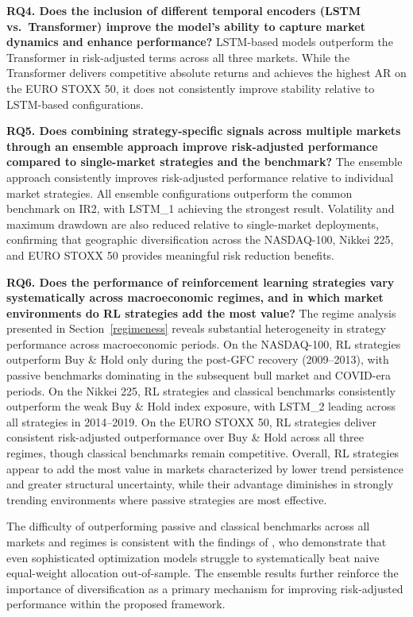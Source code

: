\documentclass[]{elsarticle}
\begin{document}
\noindent\textbf{RQ4. Does the inclusion of different temporal encoders (LSTM vs.\ Transformer) improve the model's ability to capture market dynamics and enhance performance?}
\newline LSTM-based models outperform the Transformer in risk-adjusted terms across all three markets. While the Transformer delivers competitive absolute returns and achieves the highest AR on the EURO STOXX 50, it does not consistently improve stability relative to LSTM-based configurations.

\noindent\textbf{RQ5. Does combining strategy-specific signals across multiple markets through an ensemble approach improve risk-adjusted performance compared to single-market strategies and the benchmark?}
\newline The ensemble approach consistently improves risk-adjusted performance relative to individual market strategies. All ensemble configurations outperform the common benchmark on IR2, with LSTM\_1 achieving the strongest result. Volatility and maximum drawdown are also reduced relative to single-market deployments, confirming that geographic diversification across the NASDAQ-100, Nikkei 225, and EURO STOXX 50 provides meaningful risk reduction benefits.

\noindent\textbf{RQ6. Does the performance of reinforcement learning strategies 
vary systematically across macroeconomic regimes, and in which market environments do RL strategies add the most value?}
\newline The regime analysis presented in Section~\ref{regimeness} reveals substantial heterogeneity in strategy performance across macroeconomic periods. On the NASDAQ-100, RL strategies outperform Buy \& Hold only during the post-GFC recovery (2009--2013), with passive benchmarks dominating in the subsequent bull market and COVID-era periods. On the Nikkei 225, RL strategies and classical benchmarks consistently outperform the weak Buy \& Hold index exposure, with LSTM\_2 leading across all strategies in 2014--2019. On the EURO STOXX 50, RL strategies deliver consistent risk-adjusted outperformance over Buy \& Hold across all three regimes, though classical benchmarks remain competitive. Overall, RL strategies appear to add the most value in markets characterized by lower trend persistence and greater structural uncertainty, while their advantage diminishes in strongly trending environments where passive strategies are most effective.

The difficulty of outperforming passive and classical benchmarks across all markets and regimes is consistent with the findings of \citet{DE_MIGEUL}, who demonstrate that even sophisticated optimization models struggle to systematically beat naive equal-weight allocation out-of-sample. The ensemble results further reinforce the importance of diversification as a primary mechanism for improving risk-adjusted performance within the proposed framework.
\end{document}

